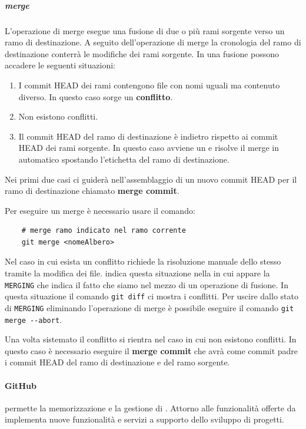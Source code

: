\subparagraph{merge}
\label{subpar:merge}
L'operazione di merge esegue una fusione di due o più rami sorgente verso un ramo di destinazione.
A seguito dell'operazione di merge la cronologia del ramo di destinazione conterrà le modifiche dei rami sorgente.
In una fusione possono accadere le seguenti situazioni:
\begin{enumerate}
    \item I commit HEAD dei rami contengono file con nomi uguali ma contenuto diverso.
    In questo caso sorge un \textbf{conflitto}.

    \item Non esistono conflitti.

    \item Il commit HEAD del ramo di destinazione è indietro rispetto ai commit HEAD dei rami sorgente.
    In questo caso avviene un \textbf{} e  risolve il merge in automatico spostando l'etichetta del ramo di destinazione.
\end{enumerate}
Nei primi due casi  ci guiderà nell'assemblaggio di un nuovo commit HEAD per il ramo di destinazione chiamato \textbf{merge commit}.

Per eseguire un merge è necessario usare il comando:
\begin{lstlisting}
    # merge ramo indicato nel ramo corrente
    git merge <nomeAlbero>
\end{lstlisting}

Nel caso in cui esista un conflitto  richiede la risoluzione manuale dello stesso tramite la modifica dei file.
 indica questa situazione nella  in cui appare la  \texttt{MERGING} che indica il fatto che siamo nel mezzo di un operazione di fusione.
In questa situazione il comando \lstinline|git diff| ci mostra i conflitti.
Per uscire dallo stato di \texttt{MERGING} eliminando l'operazione di merge è possibile eseguire il comando \lstinline|git merge --abort|.

Una volta sistemato il conflitto si rientra nel caso in cui non esistono conflitti.
In questo caso è necessario eseguire il \textbf{merge commit} che avrà come commit padre i  commit HEAD del ramo di destinazione e del 
ramo sorgente.

\paragraph{GitHub}
 permette la memorizzazione e la gestione di  .
Attorno alle funzionalità offerte da  implementa nuove funzionalità e servizi a supporto dello sviluppo di progetti.

